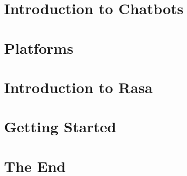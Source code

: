 \section[Intro]{Introduction to Chatbots}


\section[Platforms]{Platforms}


\section[Rasa]{Introduction to Rasa}
% 
% 


\section[Demo]{Getting Started}
% 



% 


% 





% 


\section[End]{The End}
% 
